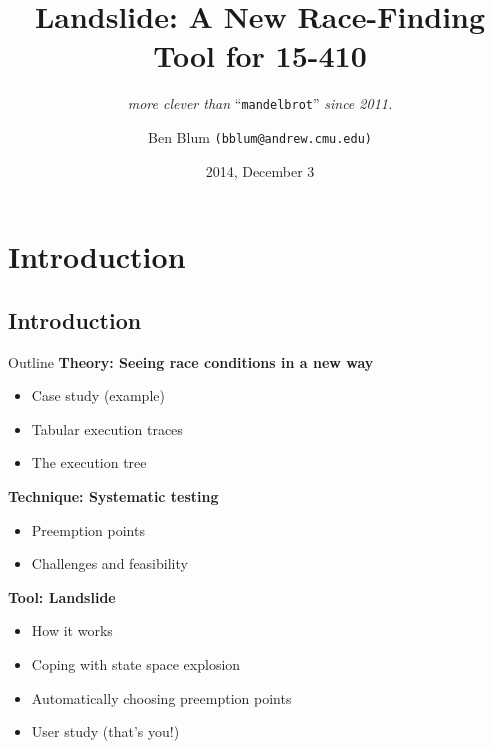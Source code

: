 \documentclass[xcolor=dvipsnames]{beamer}
\title[Landslide]{{\bf Landslide: A New Race-Finding Tool for 15-410}}
\subtitle[]{ {\em more clever than } ``\texttt{mandelbrot}'' {\em since 2011.}}
\author[Ben Blum]{Ben Blum \texttt{(bblum@andrew.cmu.edu)}}
\institute[CMU 15-410]{Carnegie Mellon University - 15-410}
\date[]{2014, December 3}
\begin{document}
\renewcommand{\inserttotalframenumber}{36}
\normalem
\begin{frame}
	\titlepage
\end{frame}


\newcommand\linegap{\vspace{0.2in}}
\newcommand\breakslide[1]{\begin{frame}{} \begin{center} #1 \end{center} \end{frame}}

\section{Introduction}
\subsection{Introduction}

\begin{frame}{Outline}
	\textbf{Theory: Seeing race conditions in a new way}
	\begin{itemize}
		\item Case study (example)
		\item Tabular execution traces
		\item The execution tree
	\end{itemize}
	{\bf Technique: Systematic testing}
	\begin{itemize}
		\item Preemption points
		\item Challenges and feasibility
	\end{itemize}
	{\bf Tool: Landslide}
	\begin{itemize}
		\item How it works
		\item Coping with state space explosion
		\item Automatically choosing preemption points
		\item User study (that's you!)
	\end{itemize}
\end{frame}
\end{document}
